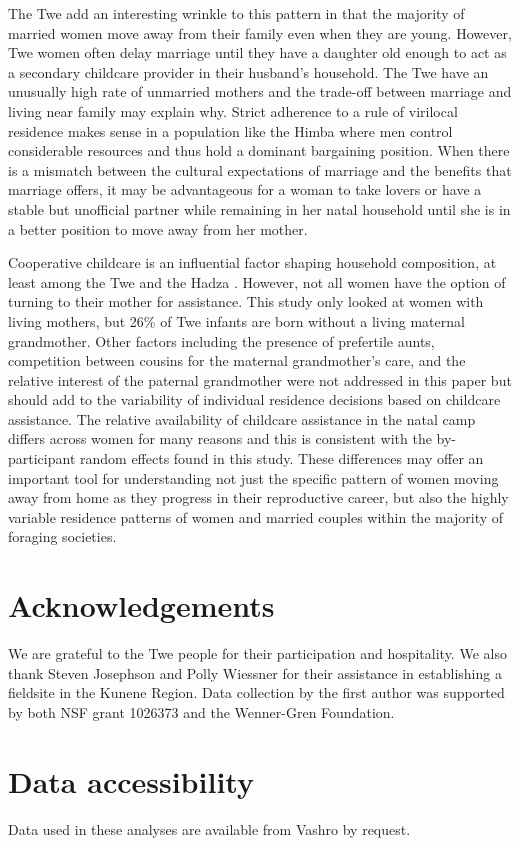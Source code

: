 \documentclass[10pt]{article}
\begin{document}
The Twe add an interesting wrinkle to this pattern in that the majority of married women move away from their family even when they are young.  However, Twe women often delay marriage until they have a daughter old enough to act as a secondary childcare provider in their husband's household.  The Twe have an unusually high rate of unmarried mothers and the trade-off between marriage and living near family may explain why.  Strict adherence to a rule of virilocal residence makes sense in a population like the Himba where men control considerable resources and thus hold a dominant bargaining position.  When there is a mismatch between the cultural expectations of marriage and the benefits that marriage offers, it may be advantageous for a woman to take lovers or have a stable but unofficial partner while remaining in her natal household until she is in a better position to move away from her mother.

Cooperative childcare is an influential factor shaping household composition, at least among the Twe and the Hadza \citep{jones2005hadza}.  However, not all women have the option of turning to their mother for assistance.  This study only looked at women with living mothers, but 26\% of Twe infants are born without a living maternal grandmother.  Other factors including the presence of prefertile aunts, competition between cousins for the maternal grandmother's care, and the relative interest of the paternal grandmother were not addressed in this paper but should add to the variability of individual residence decisions based on childcare assistance.  The relative availability of childcare assistance in the natal camp differs across women for many reasons and this is consistent with the by-participant random effects found in this study.  These differences may offer an important tool for understanding not just the specific pattern of women moving away from home as they progress in their reproductive career, but also the highly variable residence patterns of women and married couples within the majority of foraging societies.

\section*{Acknowledgements}
We are grateful to the Twe people for their participation and hospitality.  We also thank Steven Josephson and Polly Wiessner for their assistance in establishing a fieldsite in the Kunene Region. Data collection by the first author was supported by both NSF grant 1026373 and the Wenner-Gren Foundation.

\section*{Data accessibility}
Data used in these analyses are available from Vashro by request.



\end{document}
